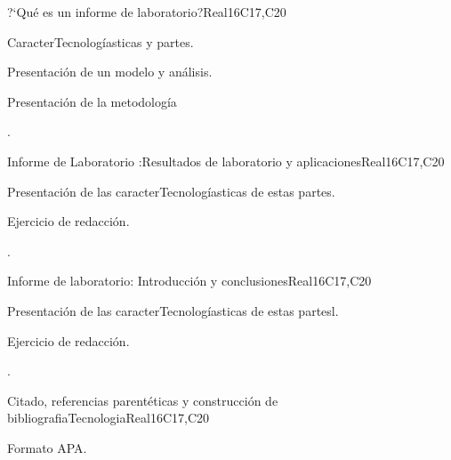 \begin{syllabus}
\begin{unit}{?`Qué es un informe de laboratorio?}{}{Real}{16}{C17,C20}
  \begin{topics}
      \item CaracterTecnologíasticas y partes.
      \item Presentación de un modelo y análisis.
      \item Presentación de la metodología 
  \end{topics}

  \begin{learningoutcomes}
   \item .%
  \end{learningoutcomes}
\end{unit}

\begin{unit}{Informe de Laboratorio :Resultados de laboratorio y aplicaciones}{}{Real}{16}{C17,C20}
  \begin{topics}
      \item Presentación de las caracterTecnologíasticas de estas partes.
      \item Ejercicio de redacción.
  \end{topics}

  \begin{learningoutcomes}
   \item .%
  \end{learningoutcomes}
\end{unit}

\begin{unit}{Informe de laboratorio: Introducción y conclusiones}{}{Real}{16}{C17,C20}
  \begin{topics}
      \item Presentación de las caracterTecnologíasticas de estas partesl.
      \item Ejercicio de redacción.
  \end{topics}

  \begin{learningoutcomes}
   \item .%
  \end{learningoutcomes}
\end{unit}

\begin{unit}{Citado, referencias parentéticas y construcción de bibliografiaTecnologia}{}{Real}{16}{C17,C20}
  \begin{topics}
      \item Formato APA.
  \end{topics}


\end{unit}
\end{syllabus}
